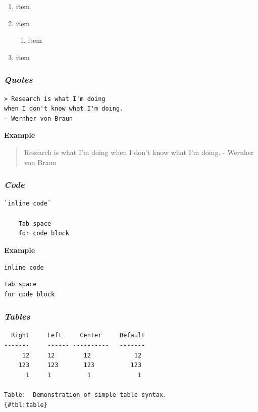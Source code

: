 \documentclass[journal,]{IEEEtran}
\providecommand{\tightlist}{%
  \setlength{\itemsep}{0pt}\setlength{\parskip}{0pt}}
\begin{document}
\begin{enumerate}
\def\labelenumi{\arabic{enumi}.}
\tightlist
\item
  item
\item
  item

  \begin{enumerate}
  \def\labelenumii{\arabic{enumii}.}
  \tightlist
  \item
    item
  \end{enumerate}
\item
  item
\end{enumerate}

\hypertarget{quotes}{%
\subsubsection{\texorpdfstring{\textbf{\emph{Quotes}}}{Quotes}}\label{quotes}}

\begin{verbatim}
> Research is what I'm doing
when I don't know what I'm doing.
- Wernher von Braun
\end{verbatim}

\textbf{Example}

\begin{quote}
Research is what I'm doing when I don't know what I'm doing. - Wernher
von Braun
\end{quote}

\hypertarget{code}{%
\subsubsection{\texorpdfstring{\textbf{\emph{Code}}}{Code}}\label{code}}

\begin{verbatim}
`inline code`

    Tab space
    for code block
\end{verbatim}

\textbf{Example}

\texttt{inline\ code}

\begin{verbatim}
Tab space
for code block
\end{verbatim}

\hypertarget{tables}{%
\subsubsection{\texorpdfstring{\textbf{\emph{Tables}}}{Tables}}\label{tables}}

\begin{verbatim}
  Right     Left     Center     Default
-------     ------ ----------   -------
     12     12        12            12
    123     123       123          123
      1     1          1             1

Table:  Demonstration of simple table syntax.
{#tbl:table}
\end{verbatim}
\end{document}
